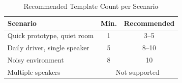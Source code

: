 \begin{table}[htbp]
\caption{Recommended Template Count per Scenario}
\centering
\begin{tabular}{lcc}
\toprule
\textbf{Scenario} & \textbf{Min.} & \textbf{Recommended} \\
\midrule
Quick prototype, quiet room  & 1 & 3--5  \\
Daily driver, single speaker & 5 & 8--10 \\
Noisy environment            & 8 & 10    \\
Multiple speakers & \multicolumn{2}{c}{Not supported} \\
\bottomrule
\end{tabular}
\label{tab:samples}
\end{table}